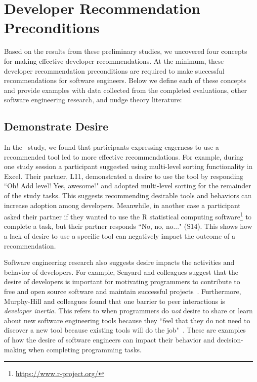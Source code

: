 \section{Developer Recommendation Preconditions}

Based on the results from these preliminary studies, we uncovered four concepts for making effective developer recommendations. At the minimum, these developer recommendation preconditions are required to make successful recommendations for software engineers. Below we define each of these concepts and provide examples with data collected from the completed evaluations, other software engineering research, and nudge theory literature:

\subsection{Demonstrate Desire}

In the \peer~study, we found that participants expressing  eagerness  to  use  a  recommended  tool led to more effective recommendations.  For example, during one study session a participant suggested using multi-level sorting functionality in Excel. Their partner, L11, demonstrated a desire to use the tool by  responding ``Oh!  Add  level!  Yes, awesome!" and adopted multi-level sorting for the remainder of the study tasks. This suggests recommending desirable tools and behaviors can increase adoption among developers. Meanwhile, in another case a participant asked their partner if they wanted to use the R statistical computing software\footnote{\url{https://www.r-project.org/}} to complete a task, but their partner responds ``No, no, no..." (S14). This shows how a lack of desire to use a specific tool can negatively impact the outcome of a recommendation. 

Software engineering research also suggests desire impacts the activities and behavior of developers. For example, Senyard and colleagues suggest that the desire of developers is important for motivating programmers to contribute to free and open source software and maintain successful projects~\cite{senyard2004have}. Furthermore, Murphy-Hill and colleagues found that one barrier to peer interactions is \textit{developer inertia}. This refers to when programmers do \textit{not} desire to share or learn about new software engineering tools because they ``feel that they do not need to discover a new tool because existing tools will do the job"~\cite[p.~16]{Murphy-Hill2015HowDoUsers}. These are examples of how the desire of software engineers can impact their behavior and decision-making when completing programming tasks.


